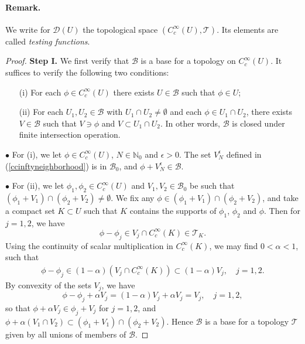 \documentclass{article}
\numberwithin{equation}{section}
\newcommand{\bbN}{\mathbb{N}}
\newcommand{\scr}{\mathscr}
\renewcommand{\cal}{\mathcal}
\theoremstyle{plain}
\theoremstyle{definition}
\begin{document}
\paragraph{Remark.} We write for $\cal{D}(U)$ the topological space $(C_c^\infty(U),\scr{T})$. Its elements are called \textit{testing functions}.
\begin{proof}
\textbf{Step I.} We first verify that $\scr{B}$ is a base for a topology on $C_c^\infty(U)$. It suffices to verify the following two conditions:
\begin{itemize}
\item[(i)] For each $\phi\in C_c^\infty(U)$ there exists $U\in\scr{B}$ such that $\phi\in U$;
\item[(ii)] For each $U_1,U_2\in\scr{B}$ with $U_1\cap U_2\neq\emptyset$ and each $\phi\in U_1\cap U_2$, there exists $V\in\mathscr{B}$ such that $V\ni\phi$ and $V\subset U_1\cap U_2$. In other words, $\mathscr{B}$ is closed under finite intersection operation.
\end{itemize}

\item$\bullet$ For (i), we let $\phi\in C_c^\infty(U)$, $N\in\bbN_0$ and $\epsilon>0$. The set $V_N^\epsilon$ defined in (\ref{ccinftyneighborhood}) is in $\mathscr{B}_0$, and $\phi+V_N^\epsilon\in\mathscr{B}$. 
\item$\bullet$ For (ii), we let $\phi_1,\phi_2\in C_c^\infty(U)$ and $V_1,V_2\in\mathscr{B}_0$ be such that $(\phi_1+V_1)\cap(\phi_2+V_2)\neq\emptyset$. We fix any $\phi\in(\phi_1+V_1)\cap(\phi_2+V_2)$, and take a compact set $K\subset U$ such that $K$ contains the supports of $\phi_1$, $\phi_2$ and $\phi$. Then for $j=1,2$, we have $$\phi-\phi_j\in V_j\cap C_c^\infty(K)\in\scr{T}_K.$$  Using the continuity of scalar multiplication in $C_c^\infty(K)$, we may find $0<\alpha<1$, such that
\begin{align*}
	\phi-\phi_j\in(1-\alpha)(V_j\cap C_c^\infty(K))\subset(1-\alpha)V_j,\quad j=1,2.
\end{align*} 
By convexity of the sets $V_j$, we have $$\phi-\phi_j+\alpha V_j=(1-\alpha)V_j+\alpha V_j=V_j,\quad j=1,2,$$ so that $\phi+\alpha V_j\in\phi_j+V_j$ for $j=1,2$, and $\phi+\alpha(V_1\cap V_2)\subset(\phi_1+V_1)\cap(\phi_2+V_2).$ Hence $\mathscr{B}$ is a base for a topology $\scr{T}$ given by all unions of members of $\scr{B}$.


\end{proof}
\end{document}
